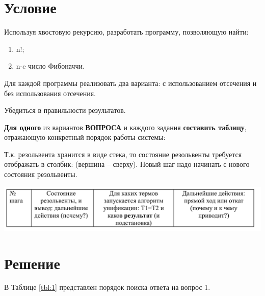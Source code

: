 \section*{Условие}
Используя хвостовую рекурсию, разработать программу, позволяющую найти:
\begin{enumerate}
	\item n!;
 	\item n-e число Фибоначчи.
\end{enumerate}
Для каждой программы реализовать два варианта: с использованием отсечения и без использования отсечения.  

Убедиться в правильности результатов.

\textbf{Для одного} из вариантов \textbf{ВОПРОСА} и каждого задания \textbf{составить
таблицу}, отражающую конкретный порядок работы системы:

Т.к. резольвента хранится в виде стека, то состояние резольвенты требуется отображать
в столбик: (вершина – сверху). Новый шаг надо начинать с нового состояния резольвенты.  

\includegraphics[scale=0.4]{./inc/img/tb_tmpl}

\section*{Решение}


В Таблице \ref{tbl:1} представлен порядок поиска ответа на вопрос 1.

